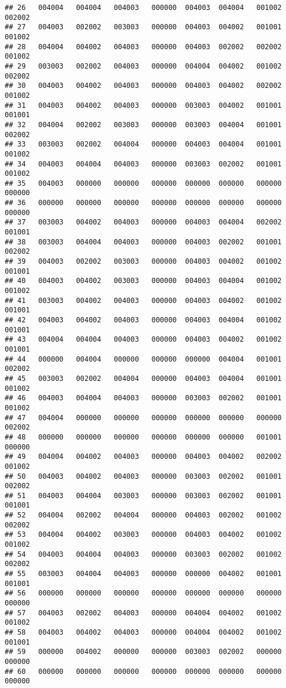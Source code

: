 \documentclass[
]{article}
\begin{document}
\begin{verbatim}
## 26   004004   004004   004003   000000  004003  004004   001002   002002
## 27   004003   002002   003003   000000  004003  004002   001001   001002
## 28   004004   004002   004003   000000  004003  002002   002002   001002
## 29   003003   002002   004003   000000  004004  004002   001002   002002
## 30   004003   004002   004003   000000  004003  004002   002002   001002
## 31   004003   004002   004003   000000  003003  004002   001001   001001
## 32   004004   002002   003003   000000  003003  004004   001001   002002
## 33   003003   002002   004004   000000  004003  004004   001001   001002
## 34   004003   004004   004003   000000  003003  002002   001001   001002
## 35   004003   000000   000000   000000  000000  000000   000000   000000
## 36   000000   000000   000000   000000  000000  000000   000000   000000
## 37   003003   004002   004003   000000  004003  004004   002002   001001
## 38   003003   004004   004003   000000  004003  002002   001001   002002
## 39   004003   002002   003003   000000  004003  004002   001002   001001
## 40   004003   004002   003003   000000  004003  004004   001002   001002
## 41   003003   004002   004003   000000  004003  004002   001002   001001
## 42   004003   004002   004003   000000  004003  004004   001002   001001
## 43   004004   004004   004003   000000  004003  004002   001002   001001
## 44   000000   004004   000000   000000  000000  004004   001001   002002
## 45   003003   002002   004004   000000  004003  004004   001001   001002
## 46   004003   004004   004003   000000  003003  002002   001001   001002
## 47   004004   000000   000000   000000  000000  000000   000000   002002
## 48   000000   000000   000000   000000  000000  000000   001001   000000
## 49   004004   004002   004003   000000  004003  004002   002002   001002
## 50   004003   004002   004003   000000  003003  002002   001001   002002
## 51   004003   004004   003003   000000  003003  002002   001001   001001
## 52   004004   002002   004004   000000  004003  002002   001002   002002
## 53   004004   004002   003003   000000  004003  004002   001002   001002
## 54   004003   004004   004003   000000  003003  002002   001002   002002
## 55   003003   004004   004003   000000  000000  004002   001001   001001
## 56   000000   000000   000000   000000  000000  000000   000000   000000
## 57   004003   002002   004003   000000  004004  004002   001002   001002
## 58   004003   004002   004003   000000  004004  004002   001002   001001
## 59   000000   004002   000000   000000  003003  002002   000000   000000
## 60   000000   000000   000000   000000  000000  000000   000000   000000

\end{verbatim}
\end{document}
